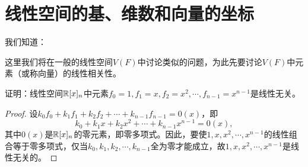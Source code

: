 \section{线性空间的基、维数和向量的坐标}

\begin{frame}
我们知道：

\vspace{.2in} \pause 

这里我们将在一般的线性空间$V(F)$中讨论类似的问题，为此先要讨论$V(F)$中元素（或称向量）的线性相关性。
\end{frame}

\begin{frame}

\begin{li}
证明：线性空间$\mathbb R[x]_n$中元素$f_0=1, f_1=x, f_2=x^2,\cdots,f_{n-1}=x^{n-1}$是线性无关。
\end{li}

\begin{proof}
设$k_0f_0+k_1f_1+k_2f_2+\cdots+k_{n-1}f_{n-1}=0(x)$，即
$$
k_0+k_1x+k_2x^2+\cdots+k_{n-1}x^{n-1}=0(x),
$$
其中$0(x)$是$\mathbb R[x]_n$的零元素，即零多项式。因此，要使$1,x,x^2,\cdots,x^{n-1}$的线性组合等于零多项式，仅当$k_0,k_1,k_2,\cdots,k_{n-1}$全为零才能成立，故$1,x,x^2,\cdots,x^{n-1}$是线性无关的。
\end{proof}
\end{frame}

